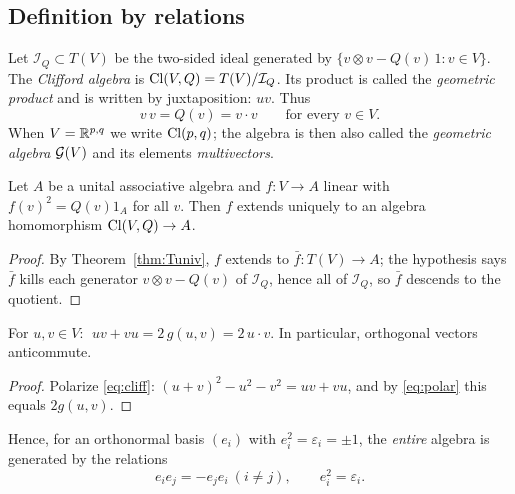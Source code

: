 \subsection{Definition by relations}

\begin{definition}
Let $\mathcal I_Q\subset T(V)$ be the two-sided ideal generated by $\{v\otimes v-Q(v)\,1: v\in V\}$. The
\emph{Clifford algebra} is $\mathrm{Cl}(V,Q)=T(V)/\mathcal I_Q$. Its product is called the
\emph{geometric product} and is written by juxtaposition: $uv$. Thus
\begin{equation}\label{eq:cliff}
 v\,v=Q(v)=v\cdot v\qquad\text{for every }v\in V.
\end{equation}
When $V=\mathbb{R}^{p,q}$ we write $\mathrm{Cl}(p,q)$; the algebra is then also called the \emph{geometric algebra} $\mathcal{G}(V)$ and its elements \emph{multivectors}.
\end{definition}

\begin{theorem}\label{thm:cliffuniv}
Let $A$ be a unital associative algebra and $f:V\to A$ linear with $f(v)^2=Q(v)1_A$ for all $v$. Then $f$ extends uniquely to an algebra homomorphism $\mathrm{Cl}(V,Q)\to A$.
\end{theorem}
\begin{proof}
By Theorem~\ref{thm:Tuniv}, $f$ extends to $\bar f:T(V)\to A$; the hypothesis says $\bar f$ kills each generator $v\otimes v-Q(v)$ of $\mathcal I_Q$, hence all of $\mathcal I_Q$, so $\bar f$ descends to the quotient.
\end{proof}

\begin{proposition}\label{prop:fund}
For $u,v\in V$: $\;uv+vu=2\,g(u,v)=2\,u\cdot v$. In particular, orthogonal vectors anticommute.
\end{proposition}
\begin{proof}
Polarize \eqref{eq:cliff}: $(u+v)^2-u^2-v^2=uv+vu$, and by \eqref{eq:polar} this equals $2g(u,v)$.
\end{proof}

Hence, for an orthonormal basis $(e_i)$ with $e_i^2=\varepsilon_i=\pm1$, the \emph{entire} algebra is generated by the relations
\[
 e_ie_j=-e_je_i\ (i\neq j),\qquad e_i^2=\varepsilon_i .
\]
